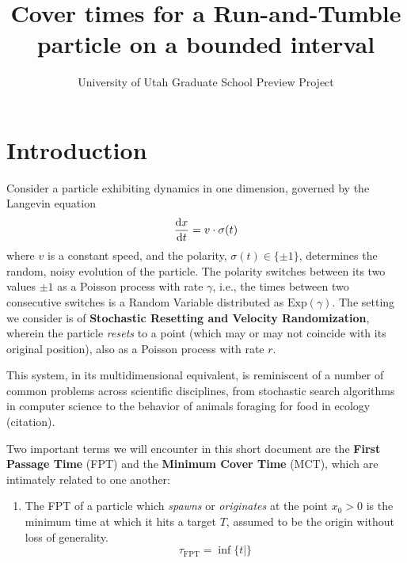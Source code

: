 \documentclass[11pt, letterpaper]{scrartcl}
\title{Cover times for a Run-and-Tumble particle on a bounded interval}
\subtitle{University of Utah Graduate School Preview Project}
\author{}
\date{}
\begin{document}
\maketitle


\section{Introduction}

Consider a particle exhibiting dynamics in one dimension, governed by the Langevin equation
\begin{equation}
    \label{eq:langevin}
    \dv{x}{t} = v \cdot \sigma(t)
\end{equation}
where $ v $ is a constant speed, and the polarity, $ \sigma(t) \in \{ \pm 1 \} $, determines the random, noisy evolution of the particle.
The polarity switches between its two values $ \pm 1 $ as a Poisson process with rate $ \gamma $, i.e., the times between two consecutive switches is a Random Variable distributed as $ \text{Exp}(\gamma) $.
The setting we consider is of \textbf{Stochastic Resetting and Velocity Randomization}, wherein the particle \emph{resets} to a point (which may or may not coincide with its original position), also as a Poisson process with rate $r$.

This system, in its multidimensional equivalent, is reminiscent of a number of common problems across scientific disciplines, from stochastic search algorithms in computer science to the behavior of animals foraging for food in ecology (citation).

Two important terms we will encounter in this short document are the \textbf{First Passage Time} (FPT) and the \textbf{Minimum Cover Time} (MCT), which are intimately related to one another:
\begin{enumerate}

    \item The FPT of a particle which \textit{spawns} or \textit{originates} at the point $x_0 > 0$ is the minimum time at which it hits a target $T$, assumed to be the origin without loss of generality.
    \begin{equation}
        \tau_{\text{FPT}} = \inf \{ t |  \} 
    \end{equation}
\end{enumerate}
\end{document}
